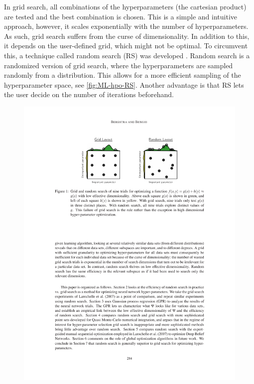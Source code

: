 In grid search, all combinations of the hyperparameters (the cartesian product) are tested and the best combination is chosen. This is a simple and intuitive approach, however, it scales exponentially with the number of hyperparameters. As such, grid search suffers from the curse of dimensionality. In addition to this, it depends on the user-defined grid, which might not be optimal. To circumvent this, a technique called random search (RS) was developed \autocite{bergstraRandomSearchHyperparameter2012a}. Random search is a randomized version of grid search, where the hyperparameters are sampled randomly from a distribution. This allows for a more efficient sampling of the hyperparameter space, see \autoref{fig:ML-hpo-RS}. Another advantage is that RS lets the user decide on the number of iterations beforehand.

\begin{figure}[htbp]
    \centering
    \includegraphics[trim={5.7cm 20cm 5.7cm 3cm}, clip, width=.8\linewidth]{figures/MasterThesis-hpo-random}
\end{figure}

